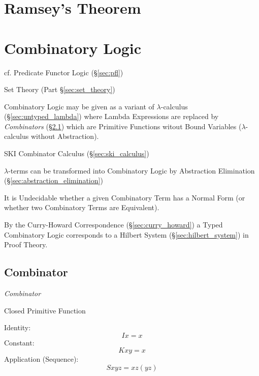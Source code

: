 \section{Ramsey's Theorem}\label{sec:ramseys_theorem}

\section{Combinatory Logic}\label{sec:combinatory_logic}

cf. Predicate Functor Logic (\S\ref{sec:pfl})

Set Theory (Part \S\ref{sec:set_theory})

Combinatory Logic may be given as a variant of $\lambda$-calculus
(\S\ref{sec:untyped_lambda}) where Lambda Expressions are replaced by
\emph{Combinators} (\S\ref{sec:combinator}) which are Primitive
Functions witout Bound Variables ($\lambda$-calculus without
Abstraction).

SKI Combinator Calculus (\S\ref{sec:ski_calculus})

$\lambda$-terms can be transformed into Combinatory Logic by
Abstraction Elimination (\S\ref{sec:abstraction_elimination})

It is Undecidable whether a given Combinatory Term has a Normal Form
(or whether two Combinatory Terms are Equivalent).

By the Curry-Howard Correspondence (\S\ref{sec:curry_howard}) a Typed
Combinatory Logic corresponds to a Hilbert System
(\S\ref{sec:hilbert_system}) in Proof Theory.



\subsection{Combinator}\label{sec:combinator}

\emph{Combinator}

Closed Primitive Function

Identity:
\[
  I x = x
\]
Constant:
\[
  K x y = x
\]
Application (Sequence):
\[
  S x y z = x z (y z)
\]

